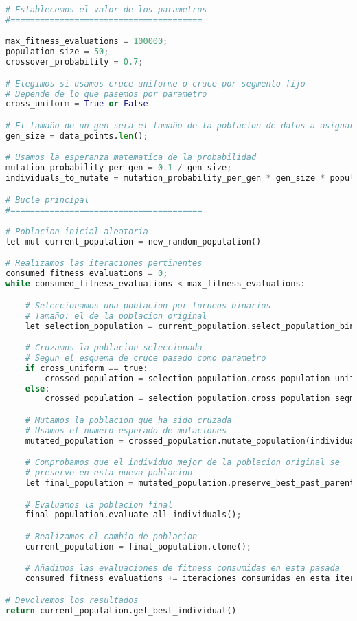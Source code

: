 \documentclass[11pt]{article}
\begin{document}
\begin{lstlisting}[language=Python, style=Boxed]
# Establecemos el valor de los parametros
#=======================================

max_fitness_evaluations = 100000;
population_size = 50;
crossover_probability = 0.7;

# Elegimos si usamos cruce uniforme o cruce por segmento fijo
# Depende de lo que pasemos por parametro
cross_uniform = True or False

# El tamaño de un gen sera el tamaño de la poblacion de datos a asignar a clusters
gen_size = data_points.len();

# Usamos la esperanza matematica de la probabilidad
mutation_probability_per_gen = 0.1 / gen_size;
individuals_to_mutate = mutation_probability_per_gen * gen_size * population_size;

# Bucle principal
#=======================================

# Poblacion inicial aleatoria
let mut current_population = new_random_population()

# Realizamos las iteraciones pertinentes
consumed_fitness_evaluations = 0;
while consumed_fitness_evaluations < max_fitness_evaluations:

    # Seleccionamos una poblacion por torneos binarios
    # Tamaño: el de la poblacion original
    let selection_population = current_population.select_population_binary_tournament(len(current_population))

    # Cruzamos la poblacion seleccionada
    # Segun el esquema de cruce pasado como parametro
    if cross_uniform == true:
        crossed_population = selection_population.cross_population_uniform()
    else:
        crossed_population = selection_population.cross_population_segment()

    # Mutamos la poblacion que ha sido cruzada
    # Usamos el numero esperado de mutaciones
    mutated_population = crossed_population.mutate_population(individuals_to_mutate);

    # Comprobamos que el individuo mejor de la poblacion original se
    # preserve en esta nueva poblacion
    let final_population = mutated_population.preserve_best_past_parent(&current_population);

    # Evaluamos la poblacion final
    final_population.evaluate_all_individuals();

    # Realizamos el cambio de poblacion
    current_population = final_population.clone();

    # Añadimos las evaluaciones de fitness consumidas en esta pasada
    consumed_fitness_evaluations += iteraciones_consumidas_en_esta_iteracion

# Devolvemos los resultados
return current_population.get_best_individual()
\end{lstlisting}
\end{document}
